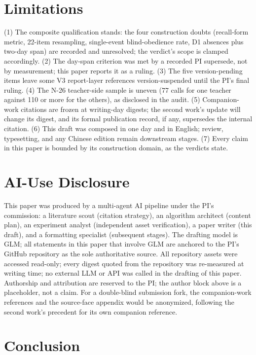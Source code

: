 \documentclass[11pt]{article}
\begin{document}
\section{Limitations}

(1) The composite qualification stands: the four construction doubts (recall-form metric, 22-item resampling, single-event blind-obedience rate, D1 absences plus two-day span) are recorded and unresolved; the verdict's scope is clamped accordingly. (2) The day-span criterion was met by a recorded PI supersede, not by measurement; this paper reports it as a ruling. (3) The five version-pending items leave some V3 report-layer references version-suspended until the PI's final ruling. (4) The N-26 teacher-side sample is uneven (77 calls for one teacher against 110 or more for the others), as disclosed in the audit. (5) Companion-work citations are frozen at writing-day digests; the second work's update will change its digest, and its formal publication record, if any, supersedes the internal citation. (6) This draft was composed in one day and in English; review, typesetting, and any Chinese edition remain downstream stages. (7) Every claim in this paper is bounded by its construction domain, as the verdicts state.

\section{AI-Use Disclosure}

This paper was produced by a multi-agent AI pipeline under the PI's commission: a literature scout (citation strategy), an algorithm architect (content plan), an experiment analyst (independent asset verification), a paper writer (this draft), and a formatting specialist (subsequent stages). The drafting model is GLM; all statements in this paper that involve GLM are anchored to the PI's GitHub repository as the sole authoritative source. All repository assets were accessed read-only; every digest quoted from the repository was re-measured at writing time; no external LLM or API was called in the drafting of this paper. Authorship and attribution are reserved to the PI; the author block above is a placeholder, not a claim. For a double-blind submission fork, the companion-work references and the source-face appendix would be anonymized, following the second work's precedent for its own companion reference.

\section{Conclusion}
\end{document}
